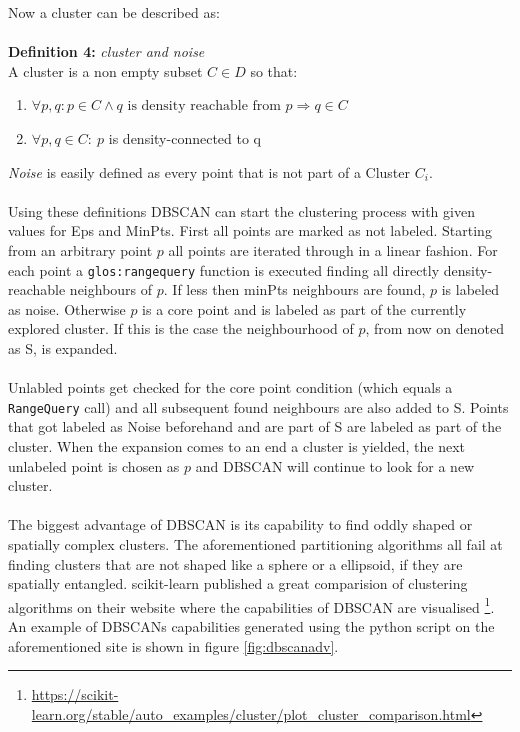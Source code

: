 Now a cluster can be described as:\\
\ \\
\textbf{Definition 4:} \textit{cluster and noise}\\
A cluster is a non empty subset $C \in D$ so that:
\begin{enumerate}
    \item $\forall p, q: p \in C \wedge q \text{ is density reachable from } p \Rightarrow q \in C$
    \item $\forall p, q \in C: \ p$ is density-connected to q
\end{enumerate}
\textit{Noise} is easily defined as every point that is not part of a Cluster $C_i$.\\
\ \\
Using these definitions DBSCAN can start the clustering process with given values for Eps and MinPts. First all points are marked as not labeled. Starting from an arbitrary point $p$ all points are iterated through in a linear fashion. For each point a \texttt{\Gls{glos:rangequery}} function is executed finding all directly density-reachable neighbours of $p$. If less then minPts neighbours are found, $p$ is labeled as noise. Otherwise $p$ is a core point and is labeled as part of the currently explored cluster. If this is the case the neighbourhood of $p$, from now on denoted as S, is expanded.\\
\ \\
Unlabled points get checked for the core point condition (which equals a \texttt{RangeQuery} call) and all subsequent found neighbours are also added to S. Points that got labeled as Noise beforehand and are part of S are labeled as part of the cluster.
When the expansion comes to an end a cluster is yielded, the next unlabeled point is chosen as $p$ and DBSCAN will continue to look for a new cluster.\\
\ \\
The biggest advantage of DBSCAN is its capability to find oddly shaped or spatially complex clusters. The aforementioned partitioning algorithms all fail at finding clusters that are not shaped like a sphere or a ellipsoid, if they are spatially entangled. scikit-learn published a great comparision of clustering algorithms on their website where the capabilities of DBSCAN are visualised \footnote{\url{https://scikit-learn.org/stable/auto_examples/cluster/plot_cluster_comparison.html}}. An example of DBSCANs capabilities generated using the python script on the aforementioned site is shown in figure \ref{fig:dbscanadv}.\\

